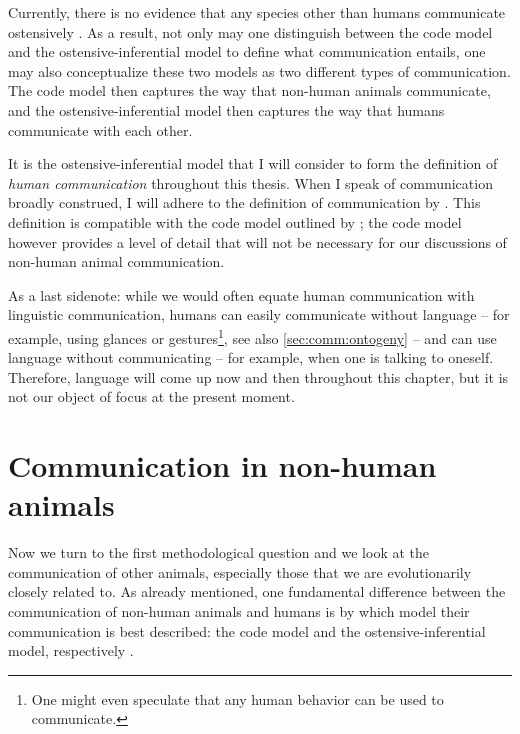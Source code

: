 Currently, there is no evidence that any species other than humans communicate ostensively \citep{Scott-Phillips18-communication}. As a result, not only may one distinguish between the code model and the ostensive-inferential model to define what communication entails, one may also conceptualize these two models as two different types of communication. The code model then captures the way that non-human animals communicate, and the ostensive-inferential model then captures the way that humans communicate with each other.

It is the ostensive-inferential model that I will consider to form the definition of \emph{human communication} throughout this thesis. When I speak of communication broadly construed, I will adhere to the definition of communication by \citet{Freeberg19}. This definition is compatible with the code model outlined by \citet{Scott-Phillips18-communication}; the code model however provides a level of detail that will not be necessary for our discussions of non-human animal communication.

As a last sidenote: while we would often equate human communication with linguistic communication, humans can easily communicate without language -- for example, using glances or gestures\footnote{One might even speculate that any human behavior can be used to communicate.}, see also \cref{sec:comm:ontogeny} -- and can use language without communicating -- for example, when one is talking to oneself. Therefore, language will come up now and then throughout this chapter, but it is not our object of focus at the present moment.

\section{Communication in non-human animals}
\label{sec:comm:phylogeny}


Now we turn to the first methodological question and we look at the communication of other animals, especially those that we are evolutionarily closely related to.
As already mentioned, one fundamental difference between the communication of non-human animals and humans is by which model their communication is best described: the code model and the ostensive-inferential model, respectively \citep{Scott-Phillips15-primate, Scott-Phillips18-communication}.

